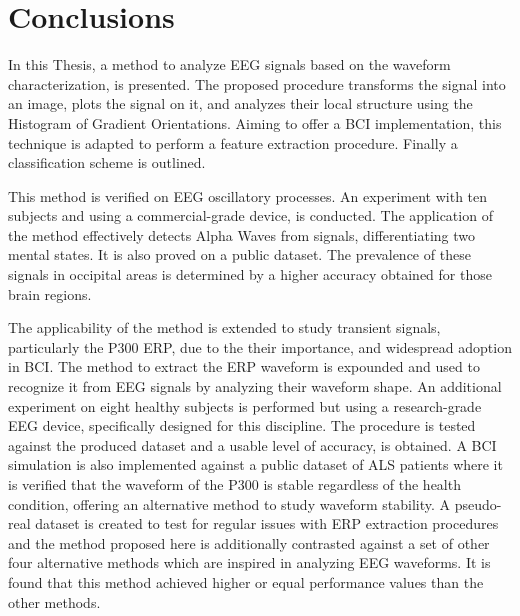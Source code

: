 \section{Conclusions}


In this Thesis, a method to analyze EEG signals based on the waveform characterization, is presented. The proposed procedure transforms the signal into an image, plots the signal on it, and analyzes their local structure using the Histogram of Gradient Orientations.   Aiming to offer a BCI implementation, this technique is adapted to perform a feature extraction procedure.  Finally a classification scheme is outlined.

This method is verified on EEG oscillatory processes.  An experiment with ten subjects and using a commercial-grade device, is conducted.  The application of the method effectively detects Alpha Waves from signals, differentiating two mental states.  It is also proved on a public dataset.  The prevalence of these signals in occipital areas is determined by a higher accuracy obtained for those brain regions.

The applicability of the method is extended to study transient signals, particularly the P300 ERP,  due to the their importance, and widespread adoption in BCI.  The method to  extract the ERP waveform is expounded and used to recognize it from EEG signals by analyzing their waveform shape.  An additional experiment on eight healthy subjects is performed but using a research-grade EEG device, specifically designed for this discipline.  The procedure is tested against the produced dataset and a usable level of accuracy, is obtained.  A BCI simulation is also implemented against a public dataset of ALS patients where it is verified that the waveform of the P300 is stable regardless of the health condition, offering an alternative method to study waveform stability.  A pseudo-real dataset is created to test for regular issues with ERP extraction procedures and the method proposed here is additionally contrasted against a set of other four alternative methods which are inspired in analyzing EEG waveforms.  It is found that this method achieved higher or equal performance values than the other methods.

